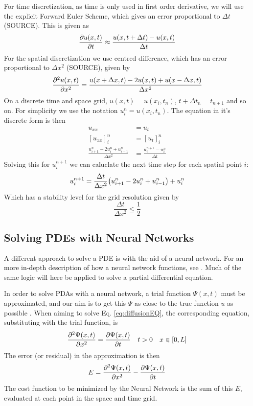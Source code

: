 For time discretization, as time is only used in first order derivative, we will use the explicit Forward Euler Scheme, which gives an error proportional to $\Delta t$ (SOURCE). This is given as 
\begin{equation}
    \pdv{u(x,t)}{t} \approx \frac{u(x,t+\Delta t) - u(x,t)}{\Delta t}
    \label{eq:FE}
\end{equation}
For the spatial discretization we use centred difference, which has an error proportional to $\Delta x^2$ (SOURCE), given by
\begin{equation}
    \pdv[2]{u(x,t)}{x} = \frac{u(x+\Delta x,t) - 2u(x,t) + u(x-\Delta x,t)}{\Delta x^2}
    \label{eq:CD}
\end{equation}
On a discrete time and space grid, $u(x,t) = u(x_i,t_n)$, $t+\Delta t_n = t_{n+1}$ and so on.
For simplicity we use the notation $u_i^n = u(x_i,t_n)$. The equation in it's discrete form is then
\begin{equation}
\begin{split}
    u_{xx} &= u_t \\
    [u_{xx}]_i^n &= [u_t]_i^n \\
    \frac{u_{i+1}^n - 2u_i^n + u_{i-1}^n}{\Delta x^2} &= \frac{u_i^{n+1}-u_i^n}{\Delta t}
\end{split}
\end{equation}
Solving this for $u_i^{n+1}$ we can caluclate the next time step for each spatial point $i$:
\begin{equation}
    u_i^{n+1} = \frac{\Delta t}{\Delta x^2}\qty(u_{i+1}^n - 2u_i^n + u_{i-1}^n)  + u_i^n
    \label{eq:theAlgorithm}
\end{equation}
Which has a stability level for the grid resolution given by 
\begin{equation*}
    \frac{\Delta t}{\Delta x^2} \leq \frac{1}{2}
\end{equation*}

\subsection{Solving PDEs with Neural Networks}
A different approach to solve a PDE is with the aid of a neural network. For an more in-depth description of how a neural network functions, see \cite{prosjekt2}. Much of the same logic will here be applied to solve a partial differential equation. 

In order to solve PDAs with a neural network, a trial function $\Psi (x,t)$ must be approximated, and our aim is to get this $\Psi$ as close to the true function $u$ as possible \cite{lagaris1998artificial}. When aiming to solve Eq. \eqref{eq:diffusionEQ}, the corresponding equation, substituting with the trial function, is
\begin{equation*}
    \pdv[2]{\Psi(x,t)}{x} = \pdv{\Psi(x,t)}{t} \quad t>0 \quad x\in [0,L]
\end{equation*}
The error (or residual) in the approximation is then
\begin{equation}
    E = \pdv[2]{\Psi(x,t)}{x} - \pdv{\Psi(x,t)}{t}
    \label{eq:errorFunc}
\end{equation}
The cost function to be minimized by the Neural Network is the sum of this $E$, evaluated at each point in the space and time grid.

